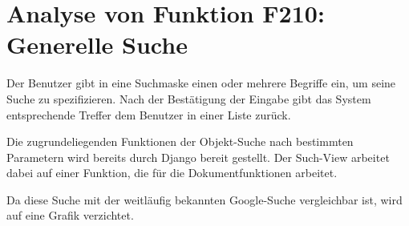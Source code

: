 \section{Analyse von Funktion F210: Generelle Suche}
Der Benutzer gibt in eine Suchmaske einen oder mehrere Begriffe ein, um seine
Suche zu spezifizieren. Nach der Bestätigung der Eingabe gibt das System
entsprechende Treffer dem Benutzer in einer Liste zurück.

Die zugrundeliegenden Funktionen der Objekt-Suche nach bestimmten Parametern
wird bereits durch Django bereit gestellt. Der Such-View arbeitet dabei auf
einer Funktion, die für die Dokumentfunktionen arbeitet.

Da diese Suche mit der weitläufig bekannten Google-Suche vergleichbar ist, wird
auf eine Grafik verzichtet.
